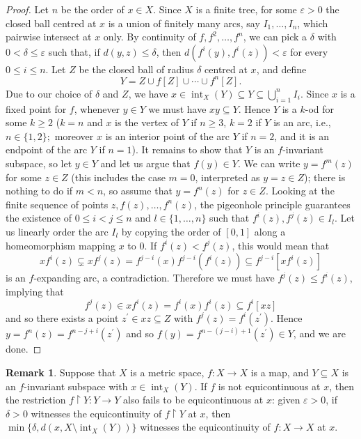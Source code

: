 \documentclass[12pt]{amsart}
\theoremstyle{definition}
\newtheorem{remark}[theorem]{Remark}
\numberwithin{equation}{section}
\renewcommand{\int}{\mathop{\mathrm{int}}}
\begin{document}
\begin{proof}
Let $n$ be the order of $x\in X.$ Since $X$ is a finite tree, for some $\varepsilon>0$ the closed ball centred at $x$ 
is a union of finitely many arcs, say $I_1,\ldots, I_n$, which pairwise intersect at $x$ only. By continuity 
of $f,f^2,\ldots,f^n$, we can pick a $\delta$ with $0<\delta\leq\varepsilon$ such that, if $d(y,z)\leq\delta$, then $d(f^i(y),f^i(z))<\varepsilon$ for every $0 \leq i\leq n$. Let $Z$ be the closed ball of radius $\delta$ centred at $x$, and define 
$$
Y=Z\cup f[Z]\cup\cdots\cup f^n[Z].
$$ 
Due to our choice of $\delta$ and $Z$, we have $x\in\int_X(Y)\subseteq Y\subseteq\bigcup_{i=1}^n I_i$. Since $x$ is a fixed point for $f$, whenever $y\in Y$ we must have $xy\subseteq Y$. Hence $Y$ is a $k$-od for some $k \geq 2$ ($k = n$ and $x$ is the vertex of $Y$ if $n\geq 3$, $k = 2$ if $Y$ is an arc, i.e., $n \in \{1,2\};$ moreover $x$ is an interior point of the arc $Y$ if $n=2$, and it is an endpoint of the arc $Y$ if $n=1$). It remains to show that $Y$ is 
an $f$-invariant subspace, so let $y\in Y$ and let us argue that $f(y)\in Y$. We can write $y=f^m(z)$ for some $z\in Z$ (this includes the case $m=0$, interpreted as $y=z\in Z$); there is nothing to do if $m<n$, so assume that $y=f^n(z)$ for $z\in Z$. Looking at the finite sequence of points $z,f(z),\ldots,f^n(z)$, the pigeonhole principle guarantees the existence of $0\leq i<j\leq n$ and $l\in\{1,\ldots,n\}$ such that $f^i(z),f^j(z)\in I_l$. Let us linearly 
order the arc $I_l$ by copying the order of $[0,1]$ along a homeomorphism mapping $x$ to $0$. If $f^i(z)<f^j(z)$, 
this would mean that 
$$
x f^i(z)\subsetneq x f^j(z)=f^{j-i}(x)f^{j-i}(f^i(z))\subseteq f^{j-i}[x f^i(z)]
$$ 
\noindent is an $f$-expanding arc, a contradiction. Therefore we must have $f^j(z)\leq f^i(z)$, implying that 
$$
f^j(z)\in x f^i(z)=f^i(x) f^i(z)\subseteq f^i[xz]
$$ 
\noindent and so there exists a point $z^\prime \in xz\subseteq Z$ with $f^j(z)=f^i(z^\prime)$. Hence 
$y=f^n(z)=f^{n-j+i}(z^\prime)$ and so $f(y)=f^{n-(j-i)+1}(z^\prime)\in Y$, and we are done.
\end{proof}

\begin{remark}\label{non-equicontinuity-restriction}
Suppose that $X$ is a metric space, $f \colon X\longrightarrow X$ is a map, and $Y\subseteq X$ is an $f$-invariant subspace with $x \in \int_X(Y)$. If $f$ is not equicontinuous at $x$, then the restriction 
$f\upharpoonright Y \colon Y\longrightarrow Y$ also fails to be equicontinuous at $x$: given $\varepsilon>0$, if $\delta>0$ witnesses the equicontinuity of $f\upharpoonright Y$ at $x$, then $\min\{\delta,d(x,X\setminus\int_X(Y))\}$ witnesses the equicontinuity of $f \colon X\longrightarrow X$ at $x$.
\end{remark}
\end{document}
